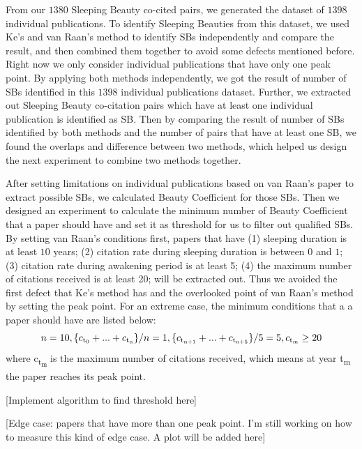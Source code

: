 \documentclass[utf8]{frontiersSCNS}
\begin{document}
From our $1380$ Sleeping Beauty co-cited pairs, we generated the dataset of $1398$ individual publications. To identify Sleeping Beauties from this dataset, we used Ke's and van Raan's method to identify SBs independently and compare the result, and then combined them together to avoid some defects mentioned before. Right now we only consider individual publications that have only one peak point. By applying both methods independently, we got the result of number of SBs identified in this $1398$ individual publications dataset. Further, we extracted out Sleeping Beauty co-citation pairs which have at least one individual publication is identified as SB. Then by comparing the result of number of SBs identified by both methods and the number of pairs that have at least one SB, we found the overlaps and difference between two methods, which helped us design the next experiment to combine two methods together.

After setting limitations on individual publications based on van Raan's paper to extract possible SBs, we calculated Beauty Coefficient for those SBs. Then we designed an experiment to calculate the minimum number of Beauty Coefficient that a paper should have and set it as threshold for us to filter out qualified SBs. By setting van Raan's conditions first, papers that have (1) sleeping duration is at least $10$ years; (2) citation rate during sleeping duration is between $0$ and $1$; (3) citation rate during awakening period is at least 5; (4) the maximum number of citations received is at least 20; will be extracted out. Thus we avoided the first defect that Ke's method has and the overlooked point of van Raan's method by setting the peak point. For an extreme case, the minimum conditions that a a paper should have are listed below:
\begin{equation}
n = 10,  \{c\textsubscript{t\textsubscript{0}} + ... + c\textsubscript{t\textsubscript{n}}\}/n = 1, \{c\textsubscript{t\textsubscript{n+1}} + ... + c\textsubscript{t\textsubscript{n+5}}\}/5 = 5, c\textsubscript{t\textsubscript{m}} \geq 20
\end{equation}
where c\textsubscript{t\textsubscript{m}} is the maximum number of citations received, which means at year t\textsubscript{m} the paper reaches its peak point. 

[Implement algorithm to find threshold here]

[Edge case: papers that have more than one peak point. I'm still working on how to measure this kind of edge case. A plot will be added here]
\end{document}
